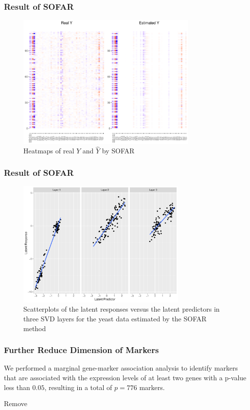 \begin{frame}
    \frametitle{Result of SOFAR}
    \begin{figure}[h]
        \centering
        \includegraphics[width=0.8\textwidth]{./figs/heatmap1.pdf}
        \caption{Heatmaps of real $Y$ and $\hat{Y}$ by SOFAR}
    \end{figure}
\end{frame}

\begin{frame}
    \frametitle{Result of SOFAR}
    \begin{figure}[h]
        \centering
        \includegraphics[width=0.75\textwidth]{./figs/latent1.pdf}
        \caption{Scatterplots of the latent responses versus the latent predictors in three SVD layers for the yeast data estimated by the SOFAR method}
    \end{figure}
\end{frame}


\begin{frame}
    \frametitle{Further Reduce Dimension of Markers}

    We performed a marginal gene-marker association analysis to identify markers that are associated with the expression levels of at least two genes with a p-value less than $0.05$, resulting in a total of $p = 776$ markers.

    Remove 

\end{frame}


